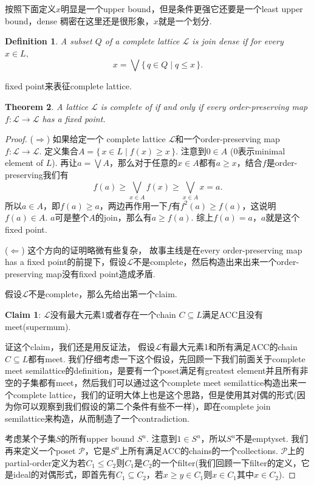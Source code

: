 \documentclass{article}
\newtheorem{theorem}{Theorem}[section]
\newtheorem{definition}[theorem]{Definition}
\newcommand*{\xfunc}[4]{{#2}\colon{#3}{#1}{#4}}
\newcommand*{\func}[3]{\xfunc{\to}{#1}{#2}{#3}}
\newcommand\Set[2]{\{\,#1\mid#2\,\}} %
\newcommand\lattice{\mathcal{L}}
\begin{document}
{\color{blue} 按照下面定义$x$明显是一个upper bound，但是条件更强它还要是一个least upper bound，dense 稠密在这里还是很形象，$x$就是一个划分}.

\begin{definition}
\rm A subset $Q$ of a complete lattice $\lattice$ is {\color{red} join dense} if for every $x \in L,$
$$
x = \bigvee\Set{q \in Q}{q \leq x}.
$$
\end{definition}

{\color{blue} fixed point来表征complete lattice}.

\begin{theorem}
\rm A lattice $\lattice$ is complete of if and only if every order-preserving map $\func{f}{\lattice}{\lattice}$ has a fixed point.
\end{theorem}

\begin{proof}
($\Rightarrow$) 如果给定一个 complete lattice $\lattice$和一个order-preserving map $\func{f}{\lattice}{\lattice}$. 定义集合$A = \Set{x \in L}{f(x) \geq x}$. 注意到$0 \in A$ (0表示minimal element of $L$). 再让$a = \bigvee A$，那么对于任意的$x \in A$都有$a \geq x$，结合$f$是order-preserving我们有
$$
f(a) \geq \bigvee\limits_{x \in A} f(x)  \geq \bigvee\limits_{x \in A} x = a.
$$
所以$a \in A$，即$f(a) \geq a$，两边再作用一下$f$有$f^2(a) \geq f(a)$，这说明$f(a) \in A$. $a$可是整个$A$的join，那么有$a \geq f(a)$. 综上$f(a) = a$，$a$就是这个fixed point.

($\Leftarrow$) 这个方向的证明略微有些复杂，{\color{blue} 故事主线是在every order-preserving map has a fixed point的前提下，假设$\lattice$不是complete，然后构造出来出来一个order-preserving map没有fixed point造成矛盾}.

假设$\lattice$不是complete，那么先给出第一个claim.

\textbf{Claim 1}: $\lattice$没有最大元素1或者存在一个chain $C \subseteq L$满足ACC且没有meet(supermum).

证这个claim，我们还是用反证法，{\color{blue} 假设$\lattice$有最大元素1和所有满足ACC的chain $C \subseteq L$都有meet}. 我们仔细考虑一下这个假设，先回顾一下我们前面关于complete meet semilattice的definition，是要有一个poset满足有greatest element并且所有非空的子集都有meet，然后我们可以通过这个complete meet semilattice构造出来一个complete lattice，我们的证明大体上也是这个思路，但是使用其对偶的形式(因为你可以观察到我们假设的第二个条件有些不一样)，即在complete join semilattice来构造，从而制造了一个contradiction.

考虑某个子集$S$的所有upper bound $S^u$. {\color{blue} 注意到$1 \in S^u$}，所以$S^u$不是emptyset. 我们再来定义一个poset $\mathcal{P}$，它是$S^u$上所有满足ACC的chains的一个collections. $\mathcal{P}$上的partial-order定义为若$C_1 \leq C_2$则$C_1$是$C_2$的一个filter(我们回顾一下filter的定义，它是ideal的对偶形式，即首先有$C_1 \subseteq C_2$，若$x \geq y \in C_1$则$x \in C_1$其中$x \in C_2$).


\end{proof}
\end{document}
